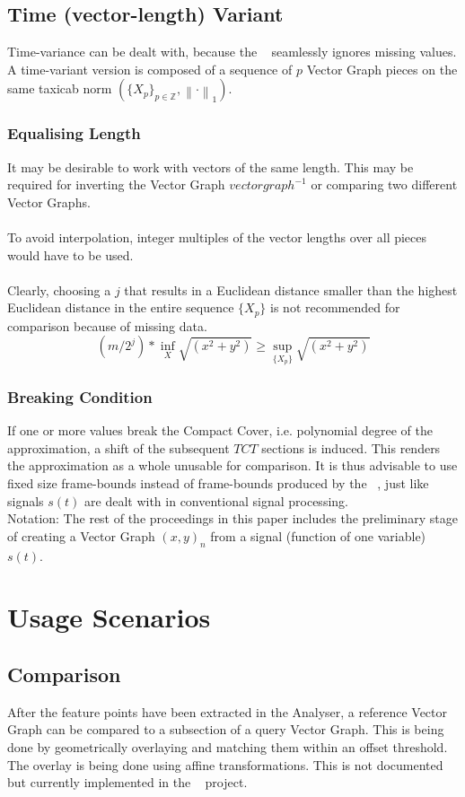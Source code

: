\documentclass{report}
\newcommand\norm[1]{\left\lVert#1\right\rVert}
\begin{document}
\section{Time (vector-length) Variant}
Time-variance can be dealt with, because the ~\cite[Stopeight\_Analyzer.tex]{Stopeight} seamlessly ignores missing values. A time-variant version is composed of a sequence of $p$ Vector Graph pieces on the same taxicab norm $(\{X_{p}\}_{p\in \mathbb{Z}},\norm{\cdot}_1)$.
\subsection{Equalising Length}
It may be desirable to work with vectors of the same length. This may be required for inverting the Vector Graph $vectorgraph^{-1}$ or comparing two different Vector Graphs.\\\\
To avoid interpolation, integer multiples of the vector lengths over all pieces would have to be used.\\\\
Clearly, choosing a $j$ that results in a Euclidean distance smaller than the highest Euclidean distance in the entire sequence $\{X_{p}\}$ is not recommended for comparison because of missing data.
\begin{equation}
(m/2^j)*\inf \limits _{X} \sqrt{(x^2+y^2)} \geq \sup \limits _{\{X_{p}\}} \sqrt{(x^2+y^2)}\label{eq:4}
\end{equation}
\subsection{Breaking Condition}
If one or more values break the Compact Cover, i.e. polynomial degree of the approximation, a shift of the subsequent $TCT$ sections is induced. This renders the approximation as a whole unusable for comparison. It is thus advisable to use fixed size frame-bounds instead of frame-bounds produced by the ~\cite[Stopeight\_Analyzer.tex]{Stopeight}, just like signals $s(t)$ are dealt with in conventional signal processing.\\
Notation: The rest of the proceedings in this paper includes the preliminary stage of creating a Vector Graph $(x,y)_{n}$ from a signal (function of one variable) $s(t)$. 

\chapter{Usage Scenarios}
\section{Comparison}
After the feature points have been extracted in the Analyser, a reference Vector Graph can be compared to a subsection of a query Vector Graph. This is being done by geometrically overlaying and matching them within an offset threshold. The overlay is being done using affine transformations. This is not documented but currently implemented in the ~\cite[Stopeight\_Comparator.tex]{Stopeight} project.
\end{document}

